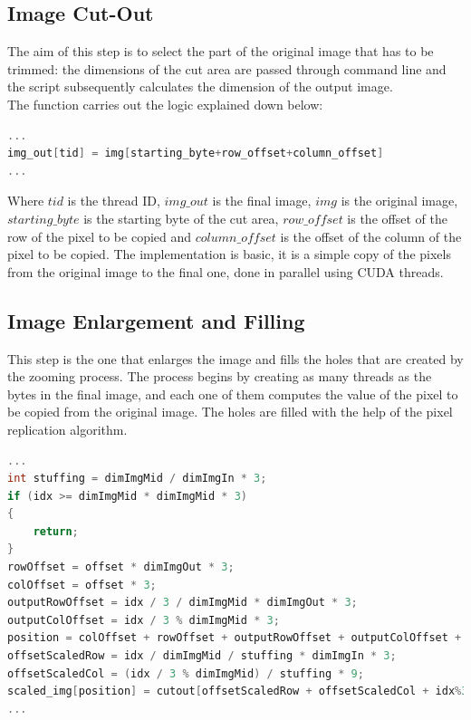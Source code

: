     \subsection{Image Cut-Out}
    The aim of this step is to select the part of the original image that has to be trimmed: 
    the dimensions of the cut area are passed through command line and the script subsequently calculates the dimension of the output image.\\ 
    The function carries out the logic explained down below:


    \noindent\begin{lstlisting}[language=C]
...
img_out[tid] = img[starting_byte+row_offset+column_offset]
...
    \end{lstlisting}

    \noindent Where $tid$ is the thread ID, $img\_out$ is the final image, $img$ is the original image, $starting\_byte$ is the starting byte of the cut area, 
    $row\_offset$ is the offset of the row of the pixel to be copied and $column\_offset$ is the offset of the column of the pixel to be copied.
    The implementation is basic, it is a simple copy of the pixels from the original image to the final one, done in parallel using CUDA threads.\\

    \subsection{Image Enlargement and Filling}
    This step is the one that enlarges the image and fills the holes that are created by the zooming process.
    The process begins by creating as many threads as the bytes in the final image, and each one of them computes 
    the value of the pixel to be copied from the original image.
    The holes are filled with the help of the pixel replication algorithm. 

    \small\noindent\begin{lstlisting}[language=C]
...
int stuffing = dimImgMid / dimImgIn * 3;
if (idx >= dimImgMid * dimImgMid * 3)
{
    return;
}
rowOffset = offset * dimImgOut * 3;
colOffset = offset * 3;
outputRowOffset = idx / 3 / dimImgMid * dimImgOut * 3;
outputColOffset = idx / 3 % dimImgMid * 3;
position = colOffset + rowOffset + outputRowOffset + outputColOffset + idx%3;
offsetScaledRow = idx / dimImgMid / stuffing * dimImgIn * 3;
offsetScaledCol = (idx / 3 % dimImgMid) / stuffing * 9;
scaled_img[position] = cutout[offsetScaledRow + offsetScaledCol + idx%3];
...
    \end{lstlisting}


